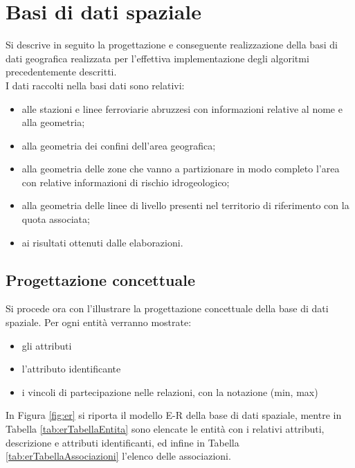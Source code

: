\section{Basi di dati spaziale}
Si descrive in seguito la progettazione e conseguente realizzazione della basi di dati geografica realizzata per l'effettiva implementazione degli algoritmi precedentemente descritti.\\
I dati raccolti nella basi dati sono relativi: 
\begin{itemize}
\item alle stazioni e linee ferroviarie abruzzesi con informazioni relative al nome e alla geometria;
\item alla geometria dei confini dell'area geografica;
\item alla geometria delle zone che vanno a partizionare in modo completo l'area con relative informazioni di rischio idrogeologico;
\item alla geometria delle linee di livello presenti nel territorio di riferimento con la quota associata;
\item ai risultati ottenuti dalle elaborazioni.
\end{itemize}

 

\subsection{Progettazione concettuale}
Si procede ora con l’illustrare la progettazione concettuale della base di dati spaziale. Per ogni entità verranno mostrate:

\begin{itemize}
\item gli attributi
\item l'attributo identificante
\item i vincoli di partecipazione nelle relazioni, con la notazione (min, max)
\end{itemize}

In Figura \ref{fig:er} si riporta il modello E-R della base di dati spaziale, mentre in Tabella \ref{tab:erTabellaEntita} sono elencate le entità con i relativi attributi, descrizione e attributi identificanti, ed infine in Tabella \ref{tab:erTabellaAssociazioni} l’elenco delle associazioni.
\pagebreak

